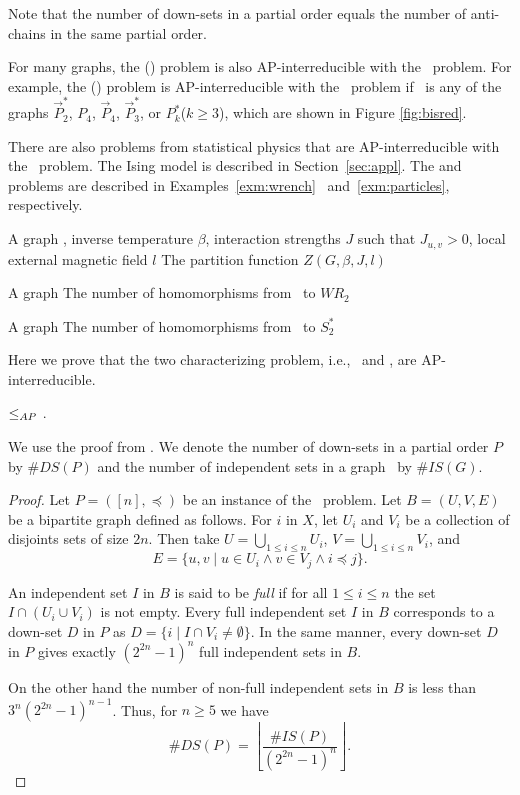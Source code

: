Note that the number of down-sets in a partial order equals
the number of anti-chains in the same partial order. 

For many graphs, the \chom(\mH) problem is also AP-interreducible with the \cbis\ problem.
For example, the \chom(\mH) problem is AP-interreducible with the \cbis\ problem
if \mH\ is any of the graphs \(\vec{P}^*_2\), \(P_4\), \(\vec{P}_4\), \(\vec{P}^*_3\),
or \(P^*_k\)(\(k\ge 3\)), which are shown in Figure \ref{fig:bisred}\@.
 
There are also problems from statistical physics that are AP-interreducible with the \cbis\
problem. The Ising model is described in Section~\ref{sec:appl}.
The \pname{\#2-Wrench-Coloring}
and  problems are described in Examples~\ref{exm:wrench}~
and~\ref{exm:particles}, respectively.

{A graph \mG, inverse temperature \(\beta\), interaction strengths \(J\) such that
\(J_{u,v} > 0\), local external magnetic field \(l\)}
{The partition function \(Z(G,\beta,J,l)\)}

{A graph \mG}
{The number of homomorphisms from \mG\ to \(WR_2\)}

{A graph \mG}
{The number of homomorphisms  from \mG\ to \(S^*_2\)}

Here we prove that the two characterizing problem, i.e., \cbis\ and \cds, are AP-interreducible.
\begin{lemma} \label{lem:dstobis}
\cds \(\le_{AP}\) \cbis\@.
\end{lemma}

We use the proof from \cite{counting}\@. We denote the number of down-sets in a partial order 
\(P\) by \(\#DS(P)\) and the number of independent sets in a graph \mG\ by
\(\#IS(G)\)\@.
\begin{proof}
Let \(P=([n],\preceq)\) be an instance of the \cds\ problem. 
Let \(B=(U,V,E)\) be a bipartite graph defined as follows.
For \(i\) in \(X\), let \(U_i\) and \(V_i\) be a collection of disjoints sets of
size \(2n\)\@. Then take \(U=\bigcup_{1 \le i \le n} U_i\), \(V=\bigcup_{1 \le i\le n} V_i\), and
\[E = \{ u,v \mid u \in U_i \land v \in V_j \land i \preceq j\}.\]

An independent set \(I\) in \(B\) is said to be \emph{full} if for all \(1 \le i \le n\)
the set \(I\cap (U_i \cup V_i)\) is not empty. Every full independent set \(I\) in \(B\)
corresponds to a down-set \(D\) in \(P\) as \(D=\{i \mid I \cap V_i \neq \emptyset\}\)\@.
In the same manner, every down-set \(D\) in \(P\) gives exactly \((2^{2n}-1)^n\) full independent
sets in \(B\)\@.

On the other hand the number of non-full independent sets in \(B\) is less than
\(3^n(2^{2n}-1)^{n-1}\)\@. Thus, for \(n\ge 5\) we have 
\[\#DS(P) = \left\lfloor\frac{\#IS(P)}{(2^{2n}-1)^n} \right\rfloor .\]
\end{proof}


